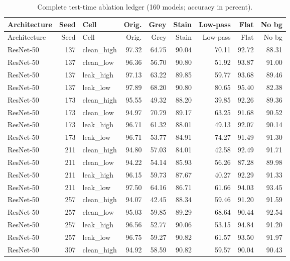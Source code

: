 {\scriptsize
\setlength{\tabcolsep}{3.5pt}
\begin{longtable}{lrlrrrrrr}
\caption{Complete test-time ablation ledger (160 models; accuracy in percent).}\label{r:tab:ledger-ablation}\\
\toprule
Architecture & Seed & Cell & Orig. & Grey & Stain & Low-pass & Flat & No bg \\
\midrule
\endfirsthead
\toprule
Architecture & Seed & Cell & Orig. & Grey & Stain & Low-pass & Flat & No bg \\
\midrule
\endhead
\bottomrule
\endfoot
ResNet-50 & 137 & clean\_high & 97.32 & 64.75 & 90.04 & 70.11 & 92.72 & 88.31 \\
ResNet-50 & 137 & clean\_low & 96.36 & 56.70 & 90.80 & 51.92 & 93.87 & 91.00 \\
ResNet-50 & 137 & leak\_high & 97.13 & 63.22 & 89.85 & 59.77 & 93.68 & 89.46 \\
ResNet-50 & 137 & leak\_low & 97.89 & 68.20 & 90.80 & 80.65 & 95.40 & 82.38 \\
ResNet-50 & 173 & clean\_high & 95.55 & 49.32 & 88.20 & 39.85 & 92.26 & 89.36 \\
ResNet-50 & 173 & clean\_low & 94.97 & 70.79 & 89.17 & 63.25 & 91.68 & 90.52 \\
ResNet-50 & 173 & leak\_high & 96.71 & 61.32 & 88.01 & 49.13 & 92.07 & 90.14 \\
ResNet-50 & 173 & leak\_low & 96.71 & 53.77 & 84.91 & 74.27 & 91.49 & 91.30 \\
ResNet-50 & 211 & clean\_high & 94.80 & 57.03 & 84.01 & 42.58 & 92.49 & 91.71 \\
ResNet-50 & 211 & clean\_low & 94.22 & 54.14 & 85.93 & 56.26 & 87.28 & 89.98 \\
ResNet-50 & 211 & leak\_high & 96.15 & 59.73 & 87.67 & 40.27 & 92.29 & 91.33 \\
ResNet-50 & 211 & leak\_low & 97.50 & 64.16 & 86.71 & 61.66 & 94.03 & 93.45 \\
ResNet-50 & 257 & clean\_high & 94.07 & 42.45 & 88.34 & 59.46 & 91.20 & 91.59 \\
ResNet-50 & 257 & clean\_low & 95.03 & 59.85 & 89.29 & 68.64 & 90.44 & 92.54 \\
ResNet-50 & 257 & leak\_high & 96.56 & 52.77 & 90.06 & 53.15 & 94.84 & 91.20 \\
ResNet-50 & 257 & leak\_low & 96.75 & 59.27 & 90.82 & 61.57 & 93.50 & 91.97 \\
ResNet-50 & 307 & clean\_high & 94.92 & 58.59 & 90.82 & 59.57 & 90.04 & 90.43 \\

\end{longtable}}
